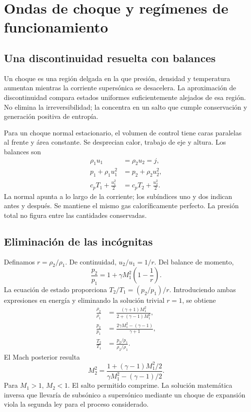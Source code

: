 \chapter{Ondas de choque y regímenes de funcionamiento}\label{ch:08}
\section{Una discontinuidad resuelta con balances}
Un choque es una región delgada en la que presión, densidad y temperatura aumentan mientras la corriente supersónica se desacelera. La aproximación de discontinuidad compara estados uniformes suficientemente alejados de esa región. No elimina la irreversibilidad; la concentra en un salto que cumple conservación y generación positiva de entropía.

Para un choque normal estacionario, el volumen de control tiene caras paralelas al frente y área constante. Se desprecian calor, trabajo de eje y altura. Los balances son
\begin{align}
 \rho_1u_1&=\rho_2u_2=j,\label{eq:shockmass}\\
 p_1+\rho_1u_1^2&=p_2+\rho_2u_2^2,\label{eq:shockmom}\\
 c_pT_1+\frac{u_1^2}{2}&=c_pT_2+\frac{u_2^2}{2}.\label{eq:shockenergy}
\end{align}
La normal apunta a lo largo de la corriente; los subíndices uno y dos indican antes y después. Se mantiene el mismo gas caloríficamente perfecto. La presión total no figura entre las cantidades conservadas.
\section{Eliminación de las incógnitas}
Definamos $r=\rho_2/\rho_1$. De continuidad, $u_2/u_1=1/r$. Del balance de momento,
\[
 \frac{p_2}{p_1}=1+\gamma M_1^2\left(1-\frac1r\right).
\]
La ecuación de estado proporciona $T_2/T_1=(p_2/p_1)/r$. Introduciendo ambas expresiones en energía y eliminando la solución trivial $r=1$, se obtiene
\begin{align}
 \frac{\rho_2}{\rho_1}&=\frac{(\gamma+1)M_1^2}{2+(\gamma-1)M_1^2},\\
 \frac{p_2}{p_1}&=\frac{2\gamma M_1^2-(\gamma-1)}{\gamma+1},\\
 \frac{T_2}{T_1}&=\frac{p_2/p_1}{\rho_2/\rho_1}.
\end{align}
El Mach posterior resulta
\begin{equation}\label{eq:Mshock}
 M_2^2=\frac{1+(\gamma-1)M_1^2/2}
 {\gamma M_1^2-(\gamma-1)/2}.
\end{equation}
Para $M_1>1$, $M_2<1$. El salto permitido comprime. La solución matemática inversa que llevaría de subsónico a supersónico mediante un choque de expansión viola la segunda ley para el proceso considerado.

